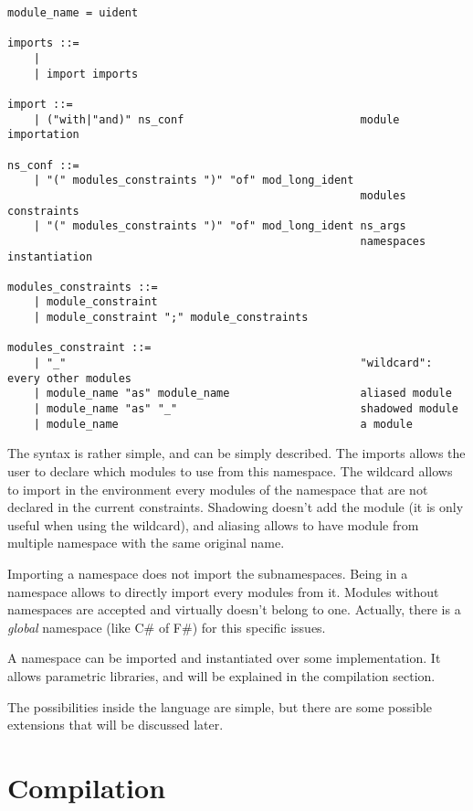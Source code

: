 \documentclass[11pt,a4paper]{article}
\begin{document}
\begin{verbatim}
module_name = uident

imports ::=
    | 
    | import imports 

import ::=
    | ("with|"and)" ns_conf                           module importation    

ns_conf ::=
    | "(" modules_constraints ")" "of" mod_long_ident 
                                                      modules constraints
    | "(" modules_constraints ")" "of" mod_long_ident ns_args 
                                                      namespaces instantiation 

modules_constraints ::=
    | module_constraint
    | module_constraint ";" module_constraints

modules_constraint ::=
    | "_"                                             "wildcard": every other modules
    | module_name "as" module_name                    aliased module
    | module_name "as" "_"                            shadowed module
    | module_name                                     a module
\end{verbatim}

The syntax is rather simple, and can be simply described. The imports allows the
user to declare which modules to use from this namespace. The wildcard allows to
import in the environment every modules of the namespace that are not declared
in the current constraints. Shadowing doesn't add the module (it is only useful
when using the wildcard), and aliasing allows to have module from multiple
namespace with the same original name.

Importing a namespace does not import the subnamespaces. Being in a namespace
allows to directly import every modules from it. Modules without namespaces are
accepted and virtually doesn't belong to one. Actually, there is a \emph{global}
namespace (like C\# of F\#) for this specific issues.

A namespace can be imported and instantiated over some implementation. It allows
parametric libraries, and will be explained in the compilation section. 

The possibilities inside the language are simple, but there are some possible
extensions that will be discussed later.

\section{Compilation}
\end{document}
